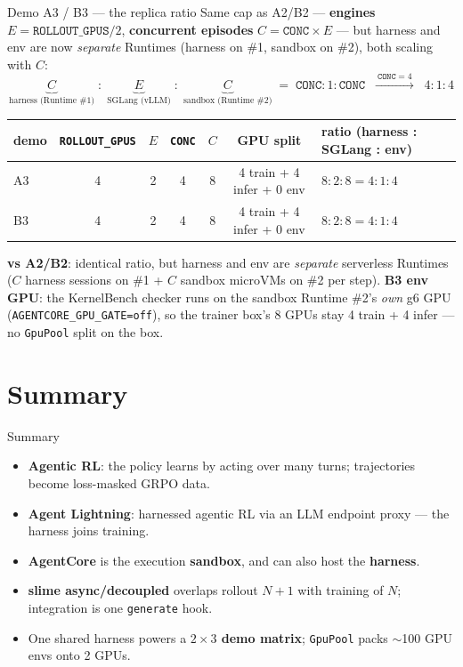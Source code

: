 \documentclass[aspectratio=169]{beamer}
\begin{document}
\begin{frame}{Demo A3 / B3 --- the replica ratio}
  \footnotesize
  Same cap as A2/B2 --- \textbf{engines} $E = \texttt{ROLLOUT\_GPUS}/2$, \textbf{concurrent episodes}
  $C = \texttt{CONC}\times E$ --- but harness and env are now \emph{separate} Runtimes (harness on
  \#1, sandbox on \#2), both scaling with $C$:
  \[ \underbrace{C}_{\text{harness (Runtime \#1)}} \;:\;
     \underbrace{E}_{\text{SGLang (vLLM)}} \;:\;
     \underbrace{C}_{\text{sandbox (Runtime \#2)}} \;=\; \texttt{CONC} : 1 : \texttt{CONC}
     \;\;\xrightarrow{\ \texttt{CONC}=4\ }\;\; 4 : 1 : 4 \]
  \vspace{-0.2em}
  \begin{center}
  \renewcommand{\arraystretch}{1.2}\scriptsize
  \begin{tabular}{lcccccl}
    \toprule
    demo & \texttt{ROLLOUT\_GPUS} & $E$ & \texttt{CONC} & $C$ & GPU split & ratio (harness : SGLang : env) \\
    \midrule
    A3 & 4 & 2 & 4 & 8 & 4 train + 4 infer + 0 env & $8:2:8 = 4:1:4$ \\
    B3 & 4 & 2 & 4 & 8 & 4 train + 4 infer + 0 env & $8:2:8 = 4:1:4$ \\
    \bottomrule
  \end{tabular}
  \end{center}
  \vspace{0.1em}
  {\scriptsize \textbf{vs A2/B2}: identical ratio, but harness and env are \emph{separate} serverless
  Runtimes ($C$ harness sessions on \#1 + $C$ sandbox microVMs on \#2 per step). \textbf{B3 env GPU}:
  the KernelBench checker runs on the sandbox Runtime \#2's \emph{own} g6 GPU (\texttt{AGENTCORE\_GPU\_GATE=off}),
  so the trainer box's 8 GPUs stay 4 train + 4 infer --- no \texttt{GpuPool} split on the box.}
\end{frame}

\section*{Summary}

\begin{frame}{Summary}
  \begin{itemize}\setlength\itemsep{0.3em}
    \item \textbf{Agentic RL}: the policy learns by acting over many turns; trajectories become
      loss-masked GRPO data.
    \item \textbf{Agent Lightning}: harnessed agentic RL via an LLM endpoint proxy --- the harness
      joins training.
    \item \textbf{AgentCore} is the execution \textbf{sandbox}, and can also host the \textbf{harness}.
    \item \textbf{slime async/decoupled} overlaps rollout $N{+}1$ with training of $N$; integration
      is one \texttt{generate} hook.
    \item One shared harness powers a \textbf{$2\times3$ demo matrix}; \texttt{GpuPool} packs $\sim$100
      GPU envs onto 2 GPUs.
  \end{itemize}
\end{frame}
\end{document}
